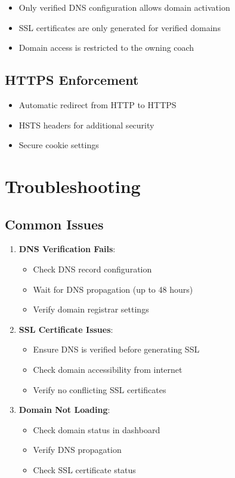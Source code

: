 \documentclass[12pt,a4paper]{article}
\begin{document}
\begin{itemize}
    \item Only verified DNS configuration allows domain activation
    \item SSL certificates are only generated for verified domains
    \item Domain access is restricted to the owning coach
\end{itemize}

\subsection{HTTPS Enforcement}

\begin{itemize}
    \item Automatic redirect from HTTP to HTTPS
    \item HSTS headers for additional security
    \item Secure cookie settings
\end{itemize}

\section{Troubleshooting}

\subsection{Common Issues}

\begin{enumerate}
    \item \textbf{DNS Verification Fails}:
        \begin{itemize}
            \item Check DNS record configuration
            \item Wait for DNS propagation (up to 48 hours)
            \item Verify domain registrar settings
        \end{itemize}
    
    \item \textbf{SSL Certificate Issues}:
        \begin{itemize}
            \item Ensure DNS is verified before generating SSL
            \item Check domain accessibility from internet
            \item Verify no conflicting SSL certificates
        \end{itemize}
    
    \item \textbf{Domain Not Loading}:
        \begin{itemize}
            \item Check domain status in dashboard
            \item Verify DNS propagation
            \item Check SSL certificate status
        \end{itemize}
\end{enumerate}
\end{document}
